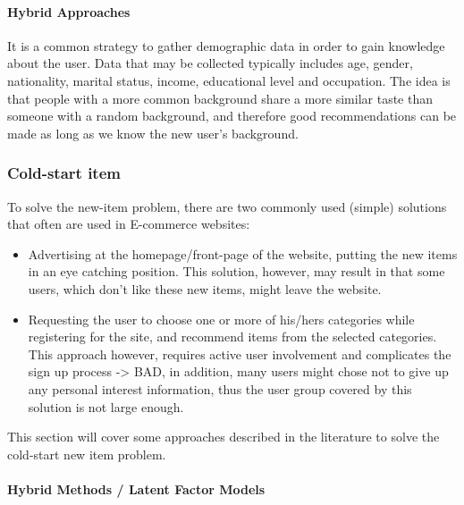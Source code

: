 \paragraph{Hybrid Approaches}

It is a common strategy to gather demographic data in order to gain knowledge about the user. Data that may be collected typically includes age, gender, nationality, marital status, income, educational level and occupation. The idea is that people with a more common background share a more similar taste than someone with a random background, and therefore good recommendations can be made as long as we know the new user’s background.



\subsubsection{Cold-start item}

To solve the new-item problem, there are two commonly used (simple) solutions that often are used in E-commerce websites:

\begin{itemize}
\item Advertising at the homepage/front-page of the website, putting the new items in an eye catching position. This solution, however, may 		result in that some users, which don't like these new items, might leave the website.
\item Requesting the user to choose one or more of his/hers categories while registering for the site, and recommend items from the selected categories. This approach however, requires active user involvement and complicates the sign up process -> BAD, in addition, many users might chose not to give up any personal interest information, thus the user group covered by this solution is not large enough.
\end{itemize}

This section will cover some approaches described in the literature to solve the cold-start new item problem.

	

\paragraph{Hybrid Methods / Latent Factor Models}

